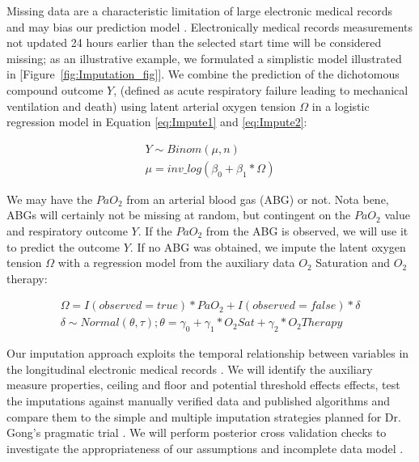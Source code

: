 \documentclass[11pt,notitlepage]{article}
\begin{document}
Missing data are a characteristic limitation of large electronic medical records and may bias our prediction model \cite{Dean_19279318}. Electronically medical records measurements not updated 24 hours earlier than the selected start time will be considered missing;  as an illustrative example, we formulated a simplistic model illustrated in [Figure~\ref{fig:Imputation_fig}]. We combine the prediction of the dichotomous compound outcome $Y$, (defined as acute respiratory failure leading to mechanical ventilation and death) using latent arterial oxygen tension $\Omega$ in a logistic regression model in Equation \ref{eq:Impute1} and \ref{eq:Impute2}: 
\begin{figure}
   \vspace{-25pt}
\begin{align} \label{eq:Impute1}
Y \sim Binom(\mu, n)\\ 
\mu = inv\_log(\beta_{0} + \beta_{1} * \Omega)\label{eq:Impute2}
\end{align}
   \vspace{-25pt}
\end{figure}

We may have the $PaO_{2}$ from an arterial blood gas (ABG) or not. Nota bene, ABGs will certainly not be missing at random, but contingent on the $PaO_2$ value and respiratory outcome $Y$. If the $PaO_{2}$ from the ABG is observed, we will use it to predict the outcome $Y$. If no ABG was obtained, we impute the latent oxygen tension $\Omega$ with a regression model from the auxiliary data  $O_{2}$ Saturation and $O_{2}$ therapy:
 
\begin{figure}
   \vspace{-25pt}
\begin{align}\label{eq:Impute3}
\Omega =  I(observed = true) * PaO_{2}   +   I(observed = false) * \delta  \\ 
\delta \sim Normal(\theta, \tau); 
\theta = \gamma_{0} + \gamma_{1}* O_{2} Sat + \gamma_{2} * O_{2} Therapy \label{eq:Impute4}
\end{align}
   \vspace{-25pt}
\end{figure}

Our imputation approach exploits the temporal relationship between variables in the longitudinal electronic medical records \cite{Welch24782349}. We will identify the auxiliary measure properties, ceiling and floor and potential threshold effects effects, test the imputations against manually verified data and published algorithms and compare them to the simple and multiple imputation strategies planned for Dr. Gong's pragmatic trial \cite{Huntington_16311133,Sloan_15027501}.  We will perform posterior cross validation checks to investigate the appropriateness of our assumptions and incomplete data model \cite{Gelman1998notasked}.
\end{document}
